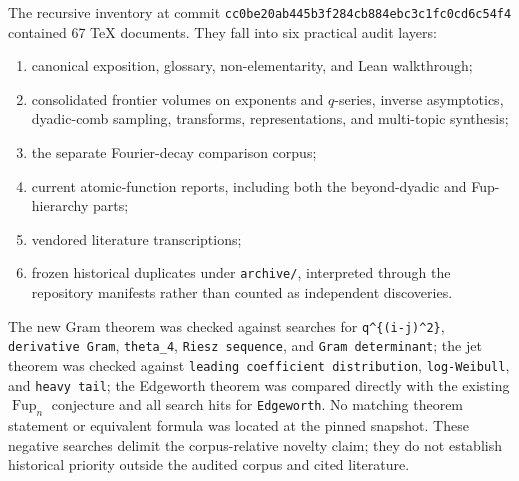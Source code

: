 \documentclass[11pt,oneside]{article}
\theoremstyle{definition}
\theoremstyle{remark}
\newcommand{\Fup}{\operatorname{Fup}}
\begin{document}
The recursive inventory at commit
\texttt{cc0be20ab445b3f284cb884ebc3c1fc0cd6c54f4} contained 67 TeX documents.  They fall into
six practical audit layers:
\begin{enumerate}
 \item canonical exposition, glossary, non-elementarity, and Lean walkthrough;
 \item consolidated frontier volumes on exponents and \(q\)-series, inverse asymptotics,
       dyadic-comb sampling, transforms, representations, and multi-topic synthesis;
 \item the separate Fourier-decay comparison corpus;
 \item current atomic-function reports, including both the beyond-dyadic and Fup-hierarchy parts;
 \item vendored literature transcriptions;
 \item frozen historical duplicates under \texttt{archive/}, interpreted through the repository manifests rather than counted as independent discoveries.
\end{enumerate}

The new Gram theorem was checked against searches for
\texttt{q\string^\{(i-j)\string^2\}}, \texttt{derivative Gram},
\texttt{theta\_4}, \texttt{Riesz sequence}, and \texttt{Gram determinant}; the jet theorem was
checked against \texttt{leading coefficient distribution}, \texttt{log-Weibull}, and
\texttt{heavy tail}; the Edgeworth theorem was compared directly with the existing
\(\Fup_n\) conjecture and all search hits for \texttt{Edgeworth}.  No matching theorem statement
or equivalent formula was located at the pinned snapshot.  These negative searches delimit the
corpus-relative novelty claim; they do not establish historical priority outside the audited
corpus and cited literature.
\end{document}
